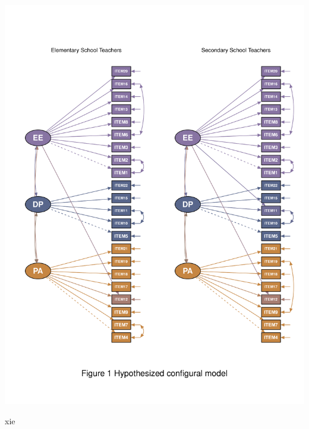 \documentclass[
]{article}
\begin{document}
\begin{center}\includegraphics{Assignment5_RongGuang_files/figure-latex/unnamed-chunk-48-1} \end{center}

xie
\end{document}

